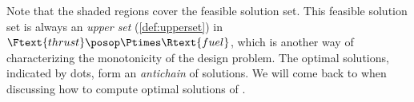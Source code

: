 \begin{example}
        Note that the shaded regions cover the feasible solution set.
        This feasible solution set is always an \emph{upper set} (\cref{def:upperset}) in~$\Ftext{thrust}\posop \Ptimes \Rtext{fuel}$, which is another way of characterizing the monotonicity of the design problem.
        The optimal solutions, indicated by dots, form an \emph{antichain} of solutions.
        We will come back to  when discussing how to compute optimal solutions of .

    \end{example}


    

%
%
%
